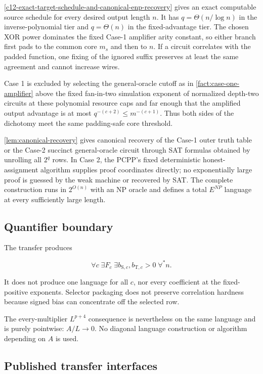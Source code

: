 \documentclass[11pt,letterpaper]{article}
\newcommand{\cref}[1]{\ref{#1}}
\theoremstyle{definition}
\theoremstyle{remark}
\begin{document}
\cref{c12-exact-target-schedule-and-canonical-enp-recovery} gives an exact computable source schedule for every
desired output length \(n\). It has \(q=\Theta(n/\log n)\) in the
inverse-polynomial tier and \(q=\Theta(n)\) in the fixed-advantage tier.
The chosen XOR power dominates the fixed Case-1 amplifier arity
constant, so either branch first pads to the common core \(m_s\) and
then to \(n\). If a circuit correlates with the padded function, one
fixing of the ignored suffix preserves at least the same agreement and
cannot increase wires.

Case 1 is excluded by selecting the general-oracle cutoff as in
\cref{fact:case-one-amplifier} above the fixed fan-in-two simulation
exponent of normalized
depth-two circuits at these polynomial resource caps and far enough that
the amplified output advantage is at most \(q^{-(c+2)}\le m^{-(c+1)}\).
Thus both sides of the dichotomy meet the same padding-safe core
threshold.

\cref{lem:canonical-recovery} gives canonical recovery of the Case-1 outer truth table or
the Case-2 succinct general-oracle circuit through SAT formulas obtained
by unrolling all \(2^q\) rows. In Case 2, the PCPP's
fixed deterministic honest-assignment algorithm supplies proof
coordinates directly; no exponentially large proof is guessed by the
weak machine or recovered by SAT. The complete construction runs in
\(2^{O(n)}\) with an NP oracle and defines a total \(E^{NP}\) language
at every sufficiently large length.

\subsection{Quantifier boundary}\label{c8-quantifier-boundary}

The transfer produces

\[
\forall c\;\exists F_c\;\exists b_{\mathrm S,c},b_{\mathrm T,c}>0\;
\forall^{\!*}n.
\]

It does not produce one language for all \(c\), nor every coefficient at
the fixed-positive exponents. Selector packaging does not preserve
correlation hardness because signed bias can concentrate off the
selected row.

The every-multiplier \(L^{p+4}\) consequence is nevertheless on the same
language and is purely pointwise: \(A/L\to0\). No diagonal language
construction or algorithm depending on \(A\) is used.

\subsection{Published transfer interfaces}
\label{sec:published-interfaces}
\end{document}
